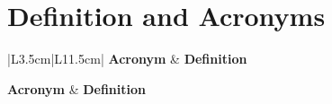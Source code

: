 \part*{Definition and Acronyms}

\begingroup
\small
\renewcommand{\arraystretch}{1.22}
\setlength{\tabcolsep}{6pt}
\begin{longtable}{|L{3.5cm}|L{11.5cm}|}
\hline
{}
\textcolor{fptHeaderText}{\textbf{Acronym}} &
\textcolor{fptHeaderText}{\textbf{Definition}} \\
\hline
\endfirsthead

\hline
{}
\textcolor{fptHeaderText}{\textbf{Acronym}} &
\textcolor{fptHeaderText}{\textbf{Definition}} \\
\hline
\endhead

\hline
\endfoot

\hline
\endlastfoot


\end{longtable}
